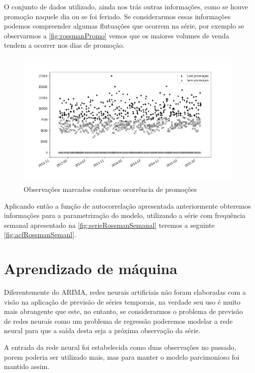 \documentclass[
    12pt,
    oneside,
    a4paper,
    english,
    brazil
]{abntex2}
\begin{document}
O conjunto de dados utilizado, ainda nos trás outras informações, como se houve
promoção naquele dia ou se foi feriado. Se considerarmos essas informações
podemos compreender algumas flutuações que ocorrem na série, por exemplo se
observarmos a \autoref{fig:rossmanPromo} vemos que os maiores volumes de venda
tendem a ocorrer nos dias de promoção.

\begin{figure}
    \centering
    \caption{Observações marcados conforme ocorrência de promoções}
    \includegraphics[width=.7\textwidth]{images/graficoRossmanPromo.png}
\end{figure}

Aplicando então a função de autocorrelação apresentada anteriormente obteremos
informações para a parametrização do modelo, utilizando a série com frequência
semanal apresentado na \autoref{fig:serieRossmanSemanal} teremos a seguinte
\autoref{fig:acfRossmanSemanl}.


\section{Aprendizado de máquina}

Diferentemente do ARIMA, redes neurais artificiais não foram elaboradas com a
visão na aplicação de previsão de séries temporais, na verdade seu uso é muito
mais abrangente que este, no entanto, se considerarmos o problema de previsão
de redes neurais como um problema de regressão poderemos modelar a rede neural
para que a saída desta seja a próxima observação da série.

A entrada da rede neural foi estabelecida como duas observações no passado,
porem poderia ser utilizado mais, mas para manter o modelo parcimonioso foi
mantido assim.
\end{document}
